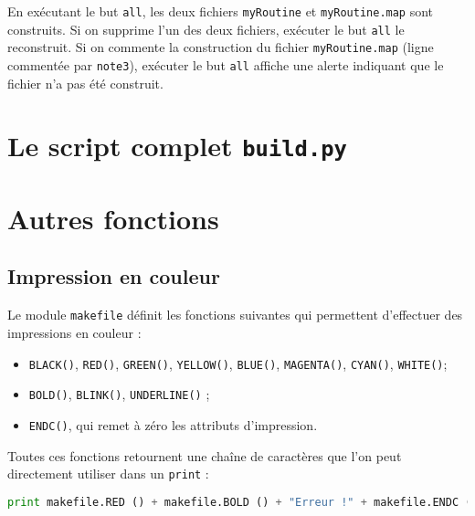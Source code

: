 \documentclass[a4paper,11pt]{extarticle}
\begin{document}
En exécutant le but \texttt{all}, les deux fichiers \texttt{myRoutine} et \texttt{myRoutine.map} sont construits. Si on supprime l'un des deux fichiers, exécuter le but \texttt{all} le reconstruit. Si on commente la construction du fichier \texttt{myRoutine.map} (ligne commentée par \texttt{note3}), exécuter le but \texttt{all} affiche une alerte indiquant que le fichier n'a pas été construit.












\section{Le script complet \texttt{build.py}}












\section{Autres fonctions}

\subsection{Impression en couleur}

Le module \texttt{makefile} définit les fonctions suivantes qui permettent d'effectuer des impressions en couleur :
\begin{itemize}
  \item \texttt{BLACK()}, \texttt{RED()}, \texttt{GREEN()}, \texttt{YELLOW()}, \texttt{BLUE()}, \texttt{MAGENTA()}, \texttt{CYAN()}, \texttt{WHITE()};
  \item \texttt{BOLD()}, \texttt{BLINK()}, \texttt{UNDERLINE()} ;
  \item \texttt{ENDC()}, qui remet à zéro les attributs d'impression.
\end{itemize}
Toutes ces fonctions retournent une chaîne de caractères que l'on peut directement utiliser dans un \texttt{print} :
\begin{lstlisting}[language=py]
print makefile.RED () + makefile.BOLD () + "Erreur !" + makefile.ENDC ()
\end{lstlisting}
\end{document}
